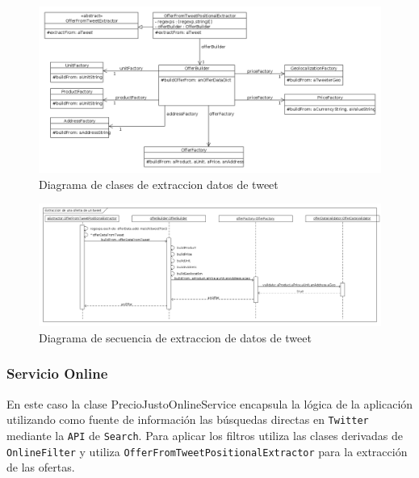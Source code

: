 \begin{figure}[h]
\centerline{\includegraphics[width=\textwidth]{./imgs/class_diagram_parsing.png}}
\caption{Diagrama de clases de extraccion datos de tweet}
\label{fig:class_parsing}
\end{figure}

\begin{figure}[h]
\centerline{\includegraphics[width=\textwidth]{./imgs/sequence_diagram_parsing.png}}
\caption{Diagrama de secuencia de extraccion de datos de tweet}
\label{fig:secuence_parsing}
\end{figure}

\subsubsection{Servicio Online}
En este caso la clase PrecioJustoOnlineService encapsula la l\'ogica de la aplicaci\'on utilizando como fuente de informaci\'on las b\'usquedas directas en \texttt{Twitter} mediante la \texttt{API} de \texttt{Search}.
Para aplicar los filtros utiliza las clases derivadas de \texttt{OnlineFilter} y utiliza \texttt{OfferFromTweetPositionalExtractor} para la extracci\'on de las ofertas.

